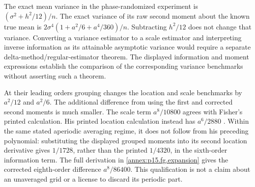 The exact mean variance in the phase-randomized experiment is
\((\sigma^2+h^2/12)/n\). The exact variance of its raw second moment
about the known true mean is
\(2\sigma^4(1+a^2/6+a^4/360)/n\). Subtracting \(h^2/12\) does not
change that variance. Converting a variance estimator to a scale estimator
and interpreting inverse information as its attainable asymptotic variance
would require a separate delta-method/regular-estimator theorem. The
displayed information and moment expressions establish the comparison of
the corresponding variance benchmarks without asserting such a theorem.

At their leading orders grouping changes the location and scale
benchmarks by \(a^2/12\) and \(a^2/6\). The additional difference from
using the first and corrected second moments is much smaller. The scale
term \(a^8/10800\) agrees with Fisher's printed calculation. His printed
location calculation instead has \(a^6/2880\)
\cite[pp.~361--363]{Fisher1922Foundations}. Within the same stated
aperiodic averaging regime, it does not follow from his preceding
polynomial: substituting the displayed grouped moments into its second
location derivative gives \(1/1728\), rather than the printed
\(1/4320\), in the sixth-order information term. The full derivation in
\cref{annex:p15.fg.expansion} gives the corrected eighth-order difference
\(a^8/86400\). This qualification is not a claim about an unaveraged grid
or a license to discard its periodic part.

